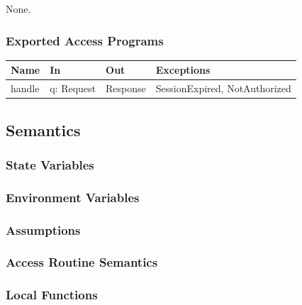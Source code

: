 \documentclass[12pt, titlepage]{article}
\begin{document}
None.

\subsubsection{Exported Access Programs}

\begin{center}\small
\begin{tabular}{>{\raggedright\arraybackslash}p{3.3cm} >{\raggedright\arraybackslash}p{4.1cm} >{\raggedright\arraybackslash}p{3.4cm} >{\raggedright\arraybackslash}p{4.0cm}}
\hline
\textbf{Name} & \textbf{In} & \textbf{Out} & \textbf{Exceptions} \\
\hline
handle & q: Request & Response & SessionExpired, NotAuthorized \\
\hline
\end{tabular}
\end{center}

\subsection{Semantics}

\subsubsection{State Variables}


\subsubsection{Environment Variables}


\subsubsection{Assumptions}


\subsubsection{Access Routine Semantics}


\subsubsection{Local Functions}

\end{document}
